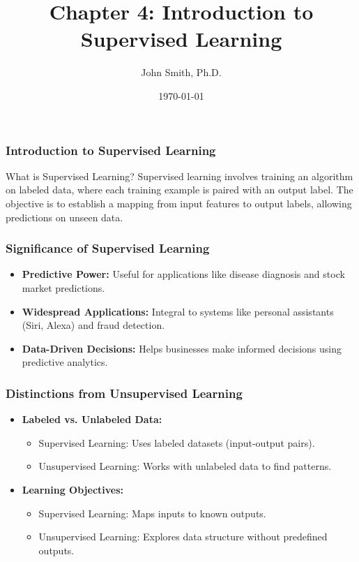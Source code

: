 \documentclass[aspectratio=169]{beamer}
\title[Introduction to Supervised Learning]{Chapter 4: Introduction to Supervised Learning}
\author[J. Smith]{John Smith, Ph.D.}
\institute[University Name]{
  Department of Computer Science\\
  University Name\\
  \vspace{0.3cm}
  Email: email@university.edu\\
  Website: www.university.edu
}
\date{\today}
\begin{document}
\frame{\titlepage}

\begin{frame}[fragile]
    \frametitle{Introduction to Supervised Learning}
    \begin{block}{What is Supervised Learning?}
        Supervised learning involves training an algorithm on labeled data, where each training example is paired with an output label. The objective is to establish a mapping from input features to output labels, allowing predictions on unseen data.
    \end{block}
\end{frame}

\begin{frame}[fragile]
    \frametitle{Significance of Supervised Learning}
    \begin{itemize}
        \item \textbf{Predictive Power:} Useful for applications like disease diagnosis and stock market predictions.
        \item \textbf{Widespread Applications:} Integral to systems like personal assistants (Siri, Alexa) and fraud detection.
        \item \textbf{Data-Driven Decisions:} Helps businesses make informed decisions using predictive analytics.
    \end{itemize}
\end{frame}

\begin{frame}[fragile]
    \frametitle{Distinctions from Unsupervised Learning}
    \begin{itemize}
        \item \textbf{Labeled vs. Unlabeled Data:} 
            \begin{itemize}
                \item Supervised Learning: Uses labeled datasets (input-output pairs).
                \item Unsupervised Learning: Works with unlabeled data to find patterns.
            \end{itemize}
        \item \textbf{Learning Objectives:}
            \begin{itemize}
                \item Supervised Learning: Maps inputs to known outputs.
                \item Unsupervised Learning: Explores data structure without predefined outputs.
            \end{itemize}
    \end{itemize}
\end{frame}
\end{document}
